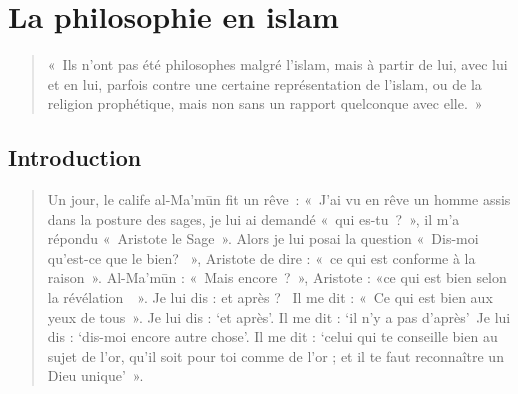\chapter{La philosophie en islam}

\begin{quote}
  « Ils n’ont pas été philosophes malgré l’islam, mais à partir de lui, avec lui et en lui, parfois contre une certaine représentation de l’islam, ou de la religion prophétique, mais non sans un rapport quelconque avec elle. » 
\end{quote}




\section{Introduction
}
\begin{quote}
Un jour, le calife al-Ma'mūn fit un rêve~: «~J'ai vu en rêve un homme
assis dans la posture des sages, je lui ai demandé «~qui es-tu~?~», il
m'a répondu «~Aristote le Sage~». Alors je lui posai la question
«~Dis-moi qu'est-ce que le bien? ~», Aristote de dire : «~ce qui est
conforme à la raison~». Al-Ma'mūn : «~Mais encore~?~», Aristote : «ce
qui est bien selon la révélation~~». Je lui dis : et après ? ~Il me dit
: «~Ce qui est bien aux yeux de tous~». Je lui dis : `et après'. Il me
dit : `il n'y a pas d'après'~Je lui dis : `dis-moi encore autre chose'.
Il me dit : `celui qui te conseille bien au sujet de l'or, qu'il soit
pour toi comme de l'or ; et il te faut reconnaître un Dieu unique'~».
\end{quote}

